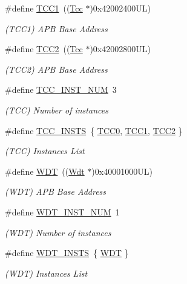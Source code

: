 \begin{DoxyCompactItemize}
\#define \mbox{\hyperlink{group___s_a_m_d21_e15_l__base_gadd92e1743edad42328471d8ed6d00a6d}{T\+C\+C1}}~((\mbox{\hyperlink{struct_tcc}{Tcc}}      $\ast$)0x42002400\+U\+L)
\begin{DoxyCompactList}\small\item\em (T\+C\+C1) A\+PB Base Address \end{DoxyCompactList}\item 
\#define \mbox{\hyperlink{group___s_a_m_d21_e15_l__base_ga121a04059fe14ada844fa8b342359d6e}{T\+C\+C2}}~((\mbox{\hyperlink{struct_tcc}{Tcc}}      $\ast$)0x42002800\+U\+L)
\begin{DoxyCompactList}\small\item\em (T\+C\+C2) A\+PB Base Address \end{DoxyCompactList}\item 
\#define \mbox{\hyperlink{group___s_a_m_d21_e15_l__base_ga592c28355fa7a9529ac689a33d039fb1}{T\+C\+C\+\_\+\+I\+N\+S\+T\+\_\+\+N\+UM}}~3
\begin{DoxyCompactList}\small\item\em (T\+CC) Number of instances \end{DoxyCompactList}\item 
\#define \mbox{\hyperlink{group___s_a_m_d21_e15_l__base_ga2c3bec33cd9ed028f65c14d67c6c5326}{T\+C\+C\+\_\+\+I\+N\+S\+TS}}~\{ \mbox{\hyperlink{group___s_a_m_d21_j18_a__base_ga99138b66570ac6a4b370ce5c3b52cd9f}{T\+C\+C0}}, \mbox{\hyperlink{group___s_a_m_d21_j18_a__base_gadd92e1743edad42328471d8ed6d00a6d}{T\+C\+C1}}, \mbox{\hyperlink{group___s_a_m_d21_j18_a__base_ga121a04059fe14ada844fa8b342359d6e}{T\+C\+C2}} \}
\begin{DoxyCompactList}\small\item\em (T\+CC) Instances List \end{DoxyCompactList}\item 
\#define \mbox{\hyperlink{group___s_a_m_d21_e15_l__base_ga9646f603341e1ee220bf5d9948f05cb0}{W\+DT}}~((\mbox{\hyperlink{struct_wdt}{Wdt}}      $\ast$)0x40001000\+U\+L)
\begin{DoxyCompactList}\small\item\em (W\+DT) A\+PB Base Address \end{DoxyCompactList}\item 
\#define \mbox{\hyperlink{group___s_a_m_d21_e15_l__base_gafac1297a6a4da34e5ff29b61dfb5552e}{W\+D\+T\+\_\+\+I\+N\+S\+T\+\_\+\+N\+UM}}~1
\begin{DoxyCompactList}\small\item\em (W\+DT) Number of instances \end{DoxyCompactList}\item 
\#define \mbox{\hyperlink{group___s_a_m_d21_e15_l__base_gacde2ac91a26c9c096b18f47009b48b81}{W\+D\+T\+\_\+\+I\+N\+S\+TS}}~\{ \mbox{\hyperlink{group___s_a_m_d21_j18_a__base_ga9646f603341e1ee220bf5d9948f05cb0}{W\+DT}} \}
\begin{DoxyCompactList}\small\item\em (W\+DT) Instances List \end{DoxyCompactList}\end{DoxyCompactItemize}


